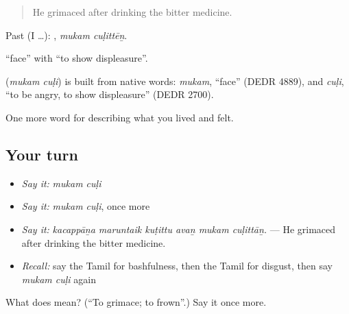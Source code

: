 \begin{quote}
He grimaced after drinking the bitter medicine.
\end{quote}

Past (I …):  , \emph{mukam cuḷittēṉ}.

 \textquotedblleft{}face\textquotedblright{} with  \textquotedblleft{}to show displeasure\textquotedblright{}.

\begin{cousinweb}
\textbf{ } (\emph{mukam cuḷi}) is built from native words:  \emph{mukam}, \textquotedblleft{}face\textquotedblright{} (DEDR 4889), and  \emph{cuḷi}, \textquotedblleft{}to be angry, to show displeasure\textquotedblright{} (DEDR 2700).
\end{cousinweb}

\begin{grammarlens}[title={What you've built}]
One more word for describing what you lived and felt.
\end{grammarlens}

\subsection*{Your turn}
\begin{itemize}
\raggedright
  \item \emph{Say it:} \emph{mukam cuḷi}
  \item \emph{Say it:} \emph{mukam cuḷi}, once more
  \item \emph{Say it:} \emph{kacappāṉa maruntaik kuṭittu avaṉ mukam cuḷittāṉ.} — He grimaced after drinking the bitter medicine.
  \item \emph{Recall:} say the Tamil for bashfulness, then the Tamil for disgust, then say \emph{mukam cuḷi} again
\end{itemize}

\begin{tcolorbox}[breakable,colback=teal!4,colframe=teal!35!black,title={Before you move on}]
What does   mean? (\textquotedblleft{}To grimace; to frown\textquotedblright{}.) Say it once more.
\end{tcolorbox}
